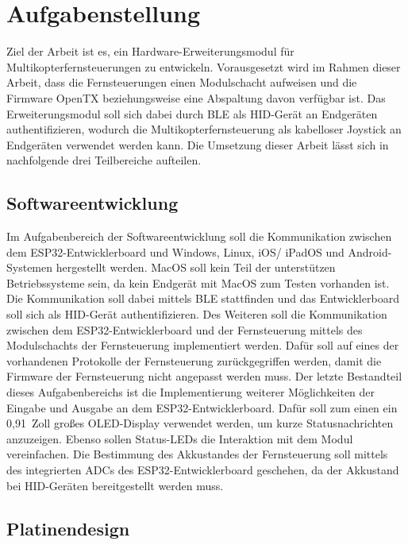 
\chapter{Aufgabenstellung}

Ziel der Arbeit ist es, ein Hardware-Erweiterungsmodul für Multikopterfernsteuerungen zu entwickeln. Vorausgesetzt wird im Rahmen dieser Arbeit, dass die Fernsteuerungen einen Modulschacht aufweisen und die Firmware OpenTX \cite{opentxMain} beziehungsweise eine Abspaltung davon verfügbar ist. Das Erweiterungsmodul soll sich dabei durch \acs{BLE} als \acs{HID}-Gerät an Endgeräten authentifizieren, wodurch die Multikopterfernsteuerung als kabelloser Joystick an Endgeräten verwendet werden kann. Die Umsetzung dieser Arbeit lässt sich in nachfolgende drei Teilbereiche aufteilen.

\section{Softwareentwicklung}

Im Aufgabenbereich der Softwareentwicklung soll die Kommunikation zwischen dem ESP32-Entwicklerboard und Windows, Linux, iOS/ iPadOS und Android-Systemen hergestellt werden. MacOS soll kein Teil der unterstützen Betriebssysteme sein, da kein Endgerät mit MacOS zum Testen vorhanden ist. Die Kommunikation soll dabei mittels \acs{BLE} stattfinden und das Entwicklerboard soll sich als \acs{HID}-Gerät authentifizieren. Des Weiteren soll die Kommunikation zwischen dem ESP32-Entwicklerboard und der Fernsteuerung mittels des Modulschachts der Fernsteuerung implementiert werden. Dafür soll auf eines der vorhandenen Protokolle der Fernsteuerung zurückgegriffen werden, damit die Firmware der Fernsteuerung nicht angepasst werden muss. Der letzte Bestandteil dieses Aufgabenbereichs ist die Implementierung weiterer Möglichkeiten der Eingabe und Ausgabe an dem ESP32-Entwicklerboard. Dafür soll zum einen ein 0,91~Zoll großes OLED-Display verwendet werden, um kurze Statusnachrichten anzuzeigen. Ebenso sollen Status-LEDs die Interaktion mit dem Modul vereinfachen. Die Bestimmung des Akkustandes der Fernsteuerung soll mittels des integrierten \acp{ADC} des ESP32-Entwicklerboard geschehen, da der Akkustand bei \acs{HID}-Geräten bereitgestellt werden muss.

\section{Platinendesign}

